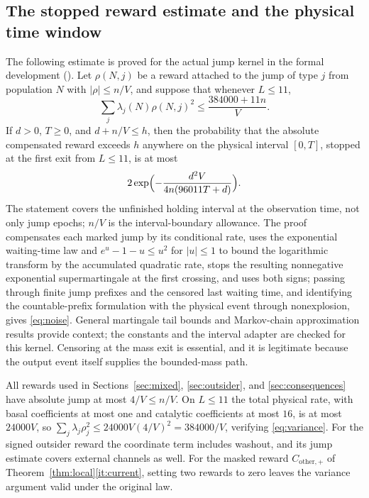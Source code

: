 \documentclass[11pt,letterpaper]{article}
\theoremstyle{plain}
\theoremstyle{definition}
\theoremstyle{remark}
\numberwithin{equation}{section}
\newcommand{\oth}{\mathrm{other}}
\begin{document}
\subsection{The stopped reward estimate and the physical time window}\label{app:reward}
The following estimate is proved for the actual jump kernel in the formal development (). Let $\rho(N,j)$ be a reward attached to the jump of type $j$ from population $N$ with $|\rho|\le n/V$, and suppose that whenever $L\le11$,
\begin{equation}\label{eq:variance}
 \sum_j\lambda_j(N)\rho(N,j)^2\le\frac{384000+11n}{V} .
\end{equation}
If $d>0$, $T\ge0$, and $d+n/V\le h$, then the probability that the absolute compensated reward exceeds $h$ anywhere on the physical interval $[0,T]$, stopped at the first exit from $L\le11$, is at most
\begin{equation}\label{eq:noise}
 2\exp\Bigl(-\frac{d^2V}{4n(96011T+d)}\Bigr) .
\end{equation}
The statement covers the unfinished holding interval at the observation time, not only jump epochs; $n/V$ is the interval-boundary allowance. The proof compensates each marked jump by its conditional rate, uses the exponential waiting-time law and $e^u-1-u\le u^2$ for $|u|\le1$ to bound the logarithmic transform by the accumulated quadratic rate, stops the resulting nonnegative exponential supermartingale at the first crossing, and uses both signs; passing through finite jump prefixes and the censored last waiting time, and identifying the countable-prefix formulation with the physical event through nonexplosion, gives \eqref{eq:noise}. General martingale tail bounds \cite{freedman1975tail} and Markov-chain approximation results \cite{darling2008differential} provide context; the constants and the interval adapter are checked for this kernel. Censoring at the mass exit is essential, and it is legitimate because the output event itself supplies the bounded-mass path.

All rewards used in Sections~\ref{sec:mixed}, \ref{sec:outsider}, and \ref{sec:consequences} have absolute jump at most $4/V\le n/V$. On $L\le11$ the total physical rate, with basal coefficients at most one and catalytic coefficients at most $16$, is at most $24000V$, so $\sum_j\lambda_j\rho_j^2\le24000V(4/V)^2=384000/V$, verifying \eqref{eq:variance}. For the signed outsider reward the coordinate term includes washout, and its jump estimate covers external channels as well. For the masked reward $C_{\oth,+}$ of Theorem~\ref{thm:local}\ref{it:current}, setting two rewards to zero leaves the variance argument valid under the original law.
\end{document}
